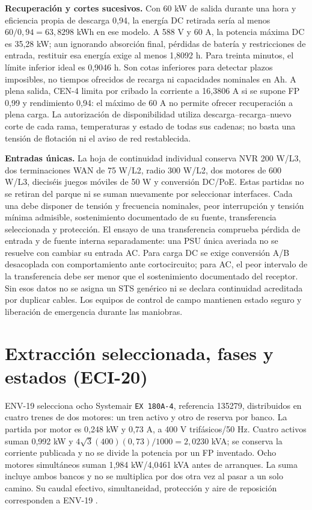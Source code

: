 \textbf{Recuperación y cortes sucesivos.} Con 60 kW de salida durante una hora y eficiencia propia de descarga 0,94, la energía DC retirada sería al menos $60/0,94=63,8298$ kWh en ese modelo. A 588 V y 60 A, la potencia máxima DC es 35,28 kW; aun ignorando absorción final, pérdidas de batería y restricciones de entrada, restituir esa energía exige al menos 1,8092 h. Para treinta minutos, el límite inferior ideal es 0,9046 h. Son cotas inferiores para detectar plazos imposibles, no tiempos ofrecidos de recarga ni capacidades nominales en Ah. A plena salida, CEN-4 limita por cribado la corriente a 16,3806 A si se supone FP 0,99 y rendimiento 0,94: el máximo de 60 A no permite ofrecer recuperación a plena carga. La autorización de disponibilidad utiliza descarga--recarga--nuevo corte de cada rama, temperaturas y estado de todas sus cadenas; no basta una tensión de flotación ni el aviso de red restablecida.

\textbf{Entradas únicas.} La hoja de continuidad individual conserva NVR 200 W/L3, dos terminaciones WAN de 75 W/L2, radio 300 W/L2, dos motores de 600 W/L3, dieciséis juegos móviles de 50 W y conversión DC/PoE. Estas partidas no se retiran del parque ni se suman nuevamente por seleccionar interfaces. Cada una debe disponer de tensión y frecuencia nominales, peor interrupción y tensión mínima admisible, sostenimiento documentado de su fuente, transferencia seleccionada y protección. El ensayo de una transferencia comprueba pérdida de entrada y de fuente interna separadamente: una PSU única averiada no se resuelve con cambiar su entrada AC. Para carga DC se exige conversión A/B desacoplada con comportamiento ante cortocircuito; para AC, el peor intervalo de la transferencia debe ser menor que el sostenimiento documentado del receptor. Sin esos datos no se asigna un STS genérico ni se declara continuidad acreditada por duplicar cables. Los equipos de control de campo mantienen estado seguro y liberación de emergencia durante las maniobras.

\section{Extracción seleccionada, fases y estados (ECI-20)}
\label{sec:sd4-extraccion-eci20}

ENV-19 selecciona ocho Systemair \texttt{EX 180A-4}, referencia 135279, distribuidos en cuatro trenes de dos motores: un tren activo y otro de reserva por banco. La partida por motor es 0,248 kW y 0,73 A, a 400 V trifásicos/50 Hz. Cuatro activos suman 0,992 kW y $4\sqrt{3}(400)(0,73)/1000=2,0230$ kVA; se conserva la corriente publicada y no se divide la potencia por un FP inventado. Ocho motores simultáneos suman 1,984 kW/4,0461 kVA antes de arranques. La suma incluye ambos bancos y no se multiplica por dos otra vez al pasar a un solo camino. Su caudal efectivo, simultaneidad, protección y aire de reposición corresponden a ENV-19 \parencite{lote19-systemair-ex180}.

